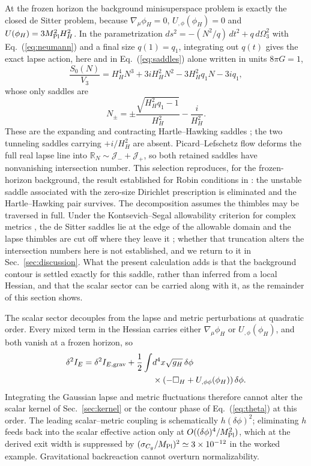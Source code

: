 \documentclass[aps,prd,twocolumn,superscriptaddress,nofootinbib,longbibliography]{revtex4-2}
\newcommand{\Mpl}{M_{\rm Pl}}
\begin{document}
At the frozen horizon the background minisuperspace problem is exactly the
closed de Sitter problem, because
$\nabla_\mu\phi_H=0$, $U_{,\phi}(\phi_H)=0$ and $U(\phi_H)=3\Mpl^2H_H^2$.
In the parametrization $ds^2=-(N^2/q)\,dt^2+q\,d\Omega_3^2$ with
Eq.~(\ref{eq:neumann}) and a final size $q(1)=q_1$, integrating out $q(t)$
gives the exact lapse action, here and in Eq.~(\ref{eq:saddles}) alone
written in units $8\pi G=1$,
\begin{equation}
\frac{S_0(N)}{V_3}=H_H^4N^3+3iH_H^2N^2-3H_H^2q_1N-3iq_1 ,
\end{equation}
whose only saddles are
\begin{equation}
N_\pm=\pm\frac{\sqrt{H_H^2q_1-1}}{H_H^2}-\frac{i}{H_H^2} .
\label{eq:saddles}
\end{equation}
These are the expanding and contracting Hartle--Hawking saddles
\cite{HartleHawking1983}; the two
tunneling saddles carrying $+i/H_H^2$ are absent. Picard--Lefschetz flow
deforms the full real lapse line into $\mathbb{R}_N\sim\mathcal{J}_-+
\mathcal{J}_+$, so both retained saddles have nonvanishing intersection
number. This selection reproduces, for the frozen-horizon background,
the result established for Robin conditions in
\cite{DiTucciLehners2019}: the unstable saddle associated with the
zero-size Dirichlet prescription is eliminated and the Hartle--Hawking
pair survives. The decomposition assumes the thimbles may be traversed
in full. Under the Kontsevich--Segal allowability criterion for complex
metrics \cite{Witten2021}, the de Sitter saddles lie at the edge of the
allowable domain and the lapse thimbles are cut off where they leave it
\cite{Lehners2022}; whether that truncation alters the intersection
numbers here is not established, and we return to it in
Sec.~\ref{sec:discussion}. What the present calculation adds is that the background
contour is settled exactly for this saddle, rather than inferred from a
local Hessian, and that the scalar sector can be carried along with it,
as the remainder of this section shows.

The scalar sector decouples from the lapse and metric perturbations at
quadratic order. Every mixed term in the Hessian carries either
$\nabla_\mu\phi_H$ or $U_{,\phi}(\phi_H)$, and both vanish at a frozen
horizon, so
\begin{equation}
\begin{aligned}
\delta^2I_E=\delta^2I_{E,\rm grav}
+\frac12\int &d^4x\sqrt{g_H}\,\delta\phi\\
&\times\left(-\Box_H+U_{,\phi\phi}(\phi_H)\right)\delta\phi .
\end{aligned}
\end{equation}
Integrating the Gaussian lapse and metric fluctuations therefore cannot
alter the scalar kernel of Sec.~\ref{sec:kernel} or the contour phase of
Eq.~(\ref{eq:theta}) at this order. The leading scalar--metric coupling is
schematically $h(\delta\phi)^2$; eliminating $h$ feeds back into the scalar
effective action only at $O((\delta\phi)^4/\Mpl^2)$, which at the derived
exit width is suppressed by $(\sigma_{C_g}/\Mpl)^2\simeq3\times10^{-12}$ in
the worked example. Gravitational backreaction cannot overturn
normalizability.
\end{document}
